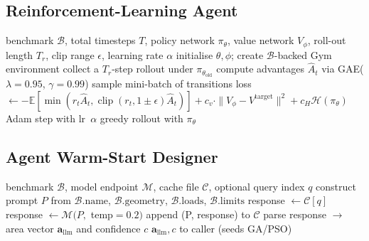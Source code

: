\subsection{Reinforcement-Learning Agent}
\label{sec:method:pseudocode:rl}

\begin{algorithm}[H]
\small
\caption{PPO truss-sizing agent (\texttt{src/rl/train.py})}
\label{alg:rl}
\begin{algorithmic}[1]
\Require benchmark $\mathcal{B}$, total timesteps $T$, policy
  network $\pi_\theta$, value network $V_\phi$, roll-out length
  $T_r$, clip range $\epsilon$, learning rate $\alpha$
\State initialise $\theta,\phi$; create $\mathcal{B}$-backed Gym environment
  \State collect a $T_r$-step rollout under $\pi_{\theta_{\mathrm{old}}}$
  \State compute advantages $\hat A_t$ via GAE($\lambda=\num{0.95}$, $\gamma=\num{0.99}$)
    \State sample mini-batch of transitions
    \State loss $\gets -\mathbb{E}[\min(r_t\hat A_t, \operatorname{clip}(r_t,1\pm\epsilon)\hat A_t)] + c_v \cdot \|V_\phi-V^{\mathrm{target}}\|^2 + c_H \mathcal{H}(\pi_\theta)$
    \State Adam step with lr~$\alpha$
  \EndFor
\EndFor
\State \Return greedy rollout with $\pi_\theta$
\end{algorithmic}
\end{algorithm}

\subsection{Agent Warm-Start Designer}
\label{sec:method:pseudocode:llm}

\begin{algorithm}[H]
\small
\caption{agent warm-start (\texttt{src/llm/warmstart.py})}
\label{alg:llm}
\begin{algorithmic}[1]
\Require benchmark $\mathcal{B}$, model endpoint $\mathcal{M}$, cache
  file $\mathcal{C}$, optional query index $q$
\State construct prompt $P$ from $\mathcal{B}.\text{name}$,
  $\mathcal{B}.\text{geometry}$, $\mathcal{B}.\text{loads}$,
  $\mathcal{B}.\text{limits}$
  \State response $\gets\mathcal{C}[q]$ 
\Else
  \State response $\gets\mathcal{M}(P,$ temp$=\num{0.2})$
  \State append (P, response) to $\mathcal{C}$
\EndIf
\State parse response $\to$ area vector $\mathbf{a}_{\mathrm{llm}}$ and confidence $c$
\State \Return $\mathbf{a}_{\mathrm{llm}},c$ to caller (seeds GA/PSO)
\end{algorithmic}
\end{algorithm}

